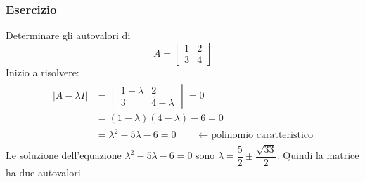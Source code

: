 \documentclass[italian]{article}
\begin{document}
\subsubsection{Esercizio}
Determinare gli autovalori di
\[
	A = 
	\begin{bmatrix}
		1 & 2 \\ 3 & 4
	\end{bmatrix}
\]
Inizio a risolvere:
\begin{gather*}
	\begin{split}
		|A - \lambda I| &= 
		\begin{vmatrix}
			1 - \lambda & 2 \\
			3 & 4 - \lambda
		\end{vmatrix}
		= 0 \\[2mm]
		&=
		(1-\lambda)(4-\lambda) - 6 = 0\\
		&= \lambda^2 - 5\lambda - 6 = 0 \qquad \leftarrow \text{polinomio caratteristico}
	\end{split}
\end{gather*}
Le soluzione dell'equazione $\lambda^2 - 5\lambda - 6 = 0$ sono $\lambda = \dfrac{5}{2} \pm \dfrac{\sqrt{33}}{2}$. Quindi la matrice ha due autovalori.

\newpage
\end{document}
